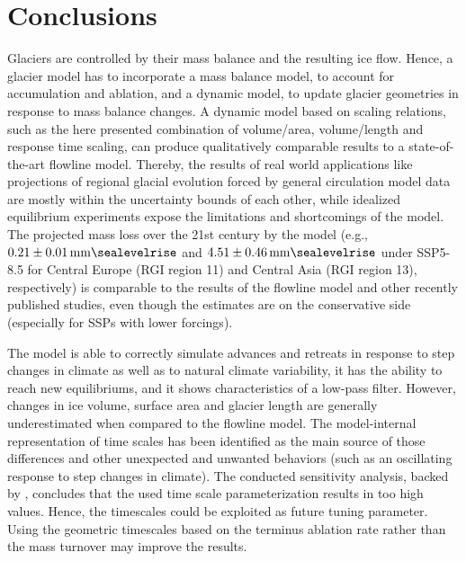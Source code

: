 \chapter{Conclusions}\label{chap:conclusions}
\thispagestyle{plain}


Glaciers are controlled by their mass balance and the resulting ice flow. Hence, a glacier model has to incorporate a mass balance model, to account for accumulation and ablation, and a dynamic model, to update glacier geometries in response to mass balance changes. A dynamic model based on scaling relations, such as the here presented combination of volume/area, volume/length and response time scaling, can produce qualitatively comparable results to a state-of-the-art flowline model. Thereby, the results of real world applications like projections of regional glacial evolution forced by general circulation model data are mostly within the uncertainty bounds of each other, while idealized equilibrium experiments expose the limitations and shortcomings of the \vas{} model. The projected mass loss over the 21st century by the \vas{} model (e.g., $0.21\SI{\pm0.01}{\milli\meter\sealevelrise}$ and $4.51\SI{\pm0.46}{\milli\meter\sealevelrise}$ under SSP5-8.5 for Central Europe (RGI region 11) and Central Asia (RGI region 13), respectively) is comparable to the results of the flowline model and other recently published studies, even though the estimates are on the conservative side (especially for SSPs with lower forcings).

The \vas{} model is able to correctly simulate advances and retreats in response to step changes in climate as well as to natural climate variability, it has the ability to reach new equilibriums, and it shows characteristics of a low-pass filter. However, changes in ice volume, surface area and glacier length are generally underestimated when compared to the flowline model. The model-internal representation of time scales has been identified as the main source of those differences and other unexpected and unwanted behaviors (such as an oscillating response to step changes in climate). The conducted sensitivity analysis, backed by \citet{Roe2020}, concludes that the used time scale parameterization results in too high values. Hence, the timescales could be exploited as future tuning parameter. Using the geometric timescales based on the terminus ablation rate \citep{Johannesson1989} rather than the mass turnover may improve the results.

